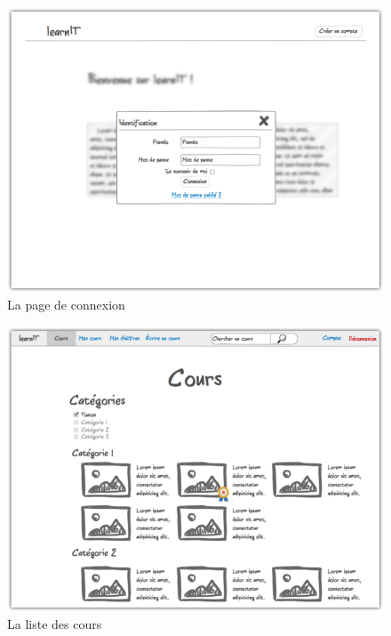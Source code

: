 \begin{figure}[!h]
    \centering
    \includegraphics[scale=1]{textures/images/annexes/maquettes/1c-Sidentifier.png}
    \caption{La page de connexion}
\end{figure}
\begin{figure}[!h]
    \centering
    \includegraphics[scale=1]{textures/images/annexes/maquettes/2-Cours.png}
    \caption{La liste des cours}
\end{figure}

\newpage

